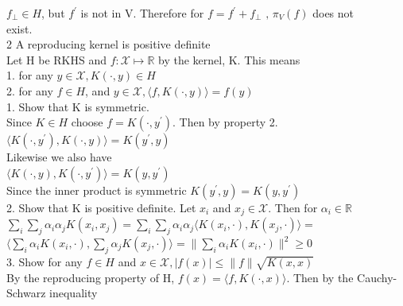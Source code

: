 \documentclass[18pt]{article}
\begin{document}
\begin{flushleft}
\vspace{.4cm}
$f_{\perp} \in H$, but $f^{\prime}$ is not in V. Therefore for $f=f^{\prime}+f_{\perp} \text{ , }\pi_V(f)$ does not\\
exist.\\
\vspace{.4cm}
2 A reproducing kernel is positive definite\\
\vspace{.4cm}
Let H be RKHS and $f:\mathcal{X} \mapsto \mathbb{R}$ by the kernel, K. This means\\
\vspace{.4cm}
1. for any $y \in \mathcal{X}, K(\cdot,y) \in H$\\
2. for any $f\in H$, and $y \in \mathcal{X}, \langle f,K(\cdot,y)\rangle=f(y)$\\
\vspace{.4cm}
1. Show that K is symmetric.\\
\vspace{.4cm}
Since $K \in H$ choose $f=K(\cdot,y^{\prime})$. Then by property 2.\\
$\langle K(\cdot,y^{\prime}),K(\cdot,y)\rangle=K(y^{\prime},y)$\\
\vspace{.4cm}
Likewise we also have\\
$\langle K(\cdot,y),K(\cdot,y^{\prime})\rangle=K(y,y^{\prime})$\\
\vspace{.4cm}
Since the inner product is symmetric $K(y^{\prime},y)=K(y,y^{\prime})$\\
\vspace{.4cm}
2. Show that K is positive definite.
\vspace{.4cm}
Let $x_i$ and $x_j \in \mathcal{X}$. Then for $\alpha_i \in \mathbb{R}$
$\sum\limits_i \sum\limits_j \alpha_i \alpha_j K(x_i,x_j)=\sum\limits_i \sum\limits_j \alpha_i \alpha_j \langle K(x_i,\cdot), K(x_j,\cdot) \rangle=$\\
$\langle \sum\limits_i \alpha_i K(x_i,\cdot),\sum\limits_j \alpha_j K(x_j,\cdot)\rangle=\parallel  \sum\limits_i \alpha_i K(x_i,\cdot) \parallel^2 \geq 0$\\
\vspace{.4cm}
3. Show for any $f\in H$ and $x \in \mathcal{X}, \lvert f(x) \rvert \leq \parallel f \parallel \sqrt{K(x,x)}$\\
\vspace{.4cm}
By the reproducing property of H, $f(x)=\langle f, K(\cdot,x) \rangle$. Then by the Cauchy-Schwarz inequality\\

\end{flushleft}
\end{document}
